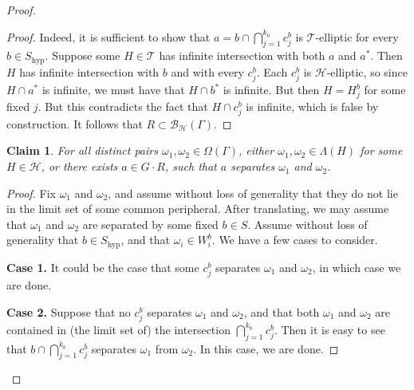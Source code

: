 \documentclass[10pt,a4paper]{amsart}
\newtheorem{claim}{Claim}
\newcommand{\br}{{\mathscr{B}}}
\newcommand{\per}{\mathcal{H}}
\begin{document}
\begin{proof}
        \begin{proof}
            Indeed, it is sufficient to show that $a = b \cap \bigcap_{j=1}^{k_b} c_j^b $ is $\mathcal T$-elliptic for every $b \in S_{\mathrm{hyp}}$. Suppose some $H \in \mathcal T$ has infinite intersection with both $a$ and $a^\ast$. Then $H$ has infinite intersection with $b$ and with every $c_j^b$. Each $c_j^b$ is $\mathcal H$-elliptic, so since $H \cap a^\ast$ is infinite, we must have that $H \cap b^\ast$ is infinite. But then $H = H_j^b$ for some fixed $j$. But this contradicts the fact that $H \cap c_j^b$ is infinite, which is false by construction. It follows that $R \subset \br_\per(\Gamma)$. 
        \end{proof}

        \begin{claim}
             For all distinct pairs  $\omega_1, \omega_2 \in \Omega(\Gamma)$, either $\omega_1, \omega_2 \in \Lambda(H)$ for some $H \in \per$, or there exists $a \in G \cdot R$, such that $a$ separates $\omega_1$ and $\omega_2$.
        \end{claim}

        \begin{proof}
            
        
        
        Fix $\omega_1$ and $\omega_2$, and assume without loss of generality that they do not lie in the limit set of some common peripheral. After translating, we may assume that $\omega_1$ and $\omega_2$ are separated by some fixed $b \in S$. Assume without loss of generality that $b \in S_{\mathrm{hyp}}$, and that $\omega_i \in W_i^b$. We have a few cases to consider. 

        \textbf{Case 1.} It could be the case that some $c_j^b$ separates $\omega_1$ and $\omega_2$, in which case we are done. 

        \textbf{Case 2.} Suppose that no $c_j^b$ separates $\omega_1$ and $\omega_2$, and that both $\omega_1$ and $\omega_2$ are contained in (the limit set of) the intersection
        $
        \bigcap_{j=1}^{k_b} c_j^b
        $.
        Then it is easy to see that 
        $
        b \cap \bigcap_{j=1}^{k_b} c_j^b 
        $
        separates $\omega_1$ from $\omega_2$. In this case, we are done. 


\end{proof}
\end{proof}
\end{document}
